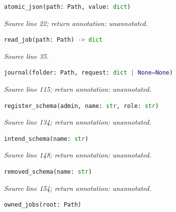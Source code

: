 


\begin{lstlisting}[language=Python]
atomic_json(path: Path, value: dict)
\end{lstlisting}


{\small \textit{Source line 22; return annotation: unannotated.}}



\begin{lstlisting}[language=Python]
read_job(path: Path) -> dict
\end{lstlisting}


{\small \textit{Source line 35.}}



\begin{lstlisting}[language=Python]
journal(folder: Path, request: dict | None=None)
\end{lstlisting}


{\small \textit{Source line 115; return annotation: unannotated.}}



\begin{lstlisting}[language=Python]
register_schema(admin, name: str, role: str)
\end{lstlisting}


{\small \textit{Source line 134; return annotation: unannotated.}}



\begin{lstlisting}[language=Python]
intend_schema(name: str)
\end{lstlisting}


{\small \textit{Source line 148; return annotation: unannotated.}}



\begin{lstlisting}[language=Python]
removed_schema(name: str)
\end{lstlisting}


{\small \textit{Source line 154; return annotation: unannotated.}}



\begin{lstlisting}[language=Python]
owned_jobs(root: Path)
\end{lstlisting}


